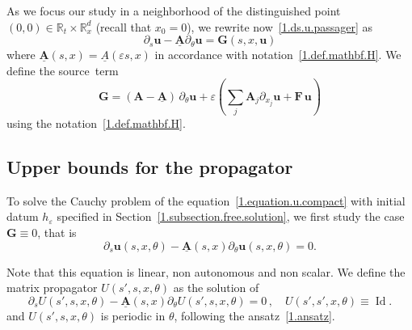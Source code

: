 \documentclass[10pt]{amsart}
\theoremstyle{definition}
\theoremstyle{plain}
\newcommand*\e{\varepsilon}
\newcommand*\R{{\mathbb R}}
\newcommand{\dptl}{\partial}%
\newcommand{\ubf}{{\mathbf u}}
\newcommand*\und{\underline}
\DeclareMathOperator{\Id}{Id}
\begin{document}
As we focus our study in a neighborhood of the distinguished point $(0,0)\in\R_{t}\times\R^{d}_{x}$ (recall that $x_0 = 0$), we rewrite now~\eqref{1.ds.u.passager} as
\begin{equation}\label{1.equation.u.compact}
\dptl_{s} \ubf - \und{{\mathbf A}} \dptl_{\theta} \ubf = {\mathbf G}(s,x,\ubf)
\end{equation}
where $\und{{\mathbf A}}(s,x) = \und{A}(\e s,x)$ in accordance with notation~\eqref{1.def.mathbf.H}. We define the source~term
\begin{equation}\label{1.def.G}
{\mathbf G} = \left({\mathbf A} - \und{{\mathbf A}} \right)\,\dptl_{\theta} \ubf + \e\left(\sum_j {\mathbf A}_j \dptl_{x_j} \ubf + {\mathbf F} \, \ubf\right)
\end{equation}
using the notation~\eqref{1.def.mathbf.H}.



\subsection{Upper bounds for the propagator}



To solve the Cauchy problem of the equation~\eqref{1.equation.u.compact} with initial datum $h_{\e}$ specified in Section~\ref{1.subsection.free.solution}, we first study the case ${\mathbf G} \equiv 0$, that is
\begin{equation}\label{1.equation.free}
\dptl_{s} \ubf(s,x,\theta) - \und{{\mathbf A}}(s,x) \dptl_{\theta} \ubf(s,x,\theta) = 0.
\end{equation}


Note that this equation is linear, non autonomous and non scalar. We define the matrix propagator $U(s',s,x,\theta)$ as the solution of
\begin{equation}\label{1.equation.propagator}
\dptl_{s} U(s',s,x,\theta) - \und{{\mathbf A}}(s,x) \dptl_{\theta} U(s',s,x,\theta) = 0 \,, \quad U(s',s',x,\theta) \equiv {\Id}.
\end{equation}
and $U(s',s,x,\theta)$ is periodic in $\theta$, following the ansatz~\eqref{1.ansatz}.
\end{document}
